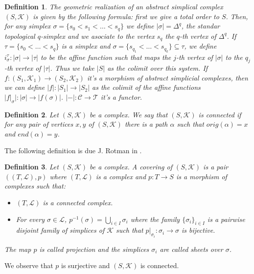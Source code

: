 \documentclass{amsart}
\newtheorem{definition}{Definition}[section]
\begin{document}
\begin{definition}
The geometric realization of an abstract simplical complex $(S,\mathcal{K})$ is given by the following formula: first we give a total order to $S$. Then, for any simplex $\sigma=\{s_{0}<s_{1}<\ldots<s_{q}\}$ we define $|\sigma|=\Delta^{q}$, the standar topological $q$-simplex and we asociate to the vertex $s_{q}$ the $q$-th vertex of $\Delta^{q}$. If $\tau=\{s_{0}<\ldots<s_{q}\}$ is a simplex and $\sigma=\{s_{q_{1}}<\ldots<s_{q_{k}}\}\subseteq\tau$, we define $i_{\sigma}^{\tau}\colon|\sigma|\to|\tau|$ to be the affine function such that maps the $j$-th vertex of $|\sigma|$ to the $q_{j}$-th vertex of $|\tau|$. Thus we take $|S|$ as the colimit over this system. If $f\colon(S_{1},\mathcal{K}_{1})\to(S_{2},\mathcal{K}_{2})$ it's a morphism of abstract simplicial complexes, then we can define $|f|\colon|S_{1}|\to|S_{2}|$ as the colimit of the affine functions $|f|_{\sigma}|\colon|\sigma|\to|f(\sigma)|$. $|-|\colon\mathcal{C}\to\mathcal{T}$ it's a functor.
\end{definition}

\begin{definition}
Let $(S,\mathcal{K})$ be a complex. We say that $(S,\mathcal{K})$ is connected if for any pair of vertices $x,y$ of $(S,\mathcal{K})$ there is a path $\alpha$ such that $orig(\alpha)=x$ and $end(\alpha)=y$.
\end{definition}

The following definition is due J. Rotman in \cite{rotman1973covering}.

\begin{definition}
Let $(S,\mathcal{K})$ be a complex. A covering of $(S,\mathcal{K})$ is a pair $((T,\mathcal{L}),p)$ where $(T,\mathcal{L})$ is a complex and $p\colon T\longrightarrow S$ is a morphism of complexes such that:
\begin{itemize}
\item $(T,\mathcal{L})$ is a connected complex.
\item For every $\sigma\in\mathcal{L}$, $p^{-1}(\sigma)=\bigcup_{i\in I}\sigma_i$ where the family $\{\sigma_i\}_{i\in I}$ is a pairwise disjoint family of simplices of $\mathcal{K}$ such that $p|_{\sigma_i}\colon \sigma_i\longrightarrow \sigma$ is bijective.
\end{itemize}
The map $p$ is called projection and the simplices $\sigma_i$ are called sheets over $\sigma$.
\end{definition}

We observe that $p$ is surjective and $(S,\mathcal{K})$ is connected.
\end{document}
